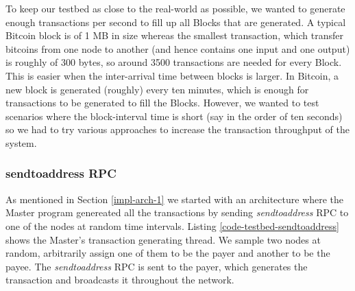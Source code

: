 To keep our testbed as close to the real-world as possible, we wanted to generate enough transactions per second to fill up all Blocks that are generated. A typical Bitcoin block is of 1 MB in size whereas the smallest transaction, which transfer bitcoins from one node to another (and hence contains one input and one output) is roughly of 300 bytes, so around 3500 transactions are needed for every Block. This is easier when the inter-arrival time between blocks is larger. In Bitcoin, a new block is generated (roughly) every ten minutes, which is enough for transactions to be generated to fill the Blocks. However, we wanted to test scenarios where the block-interval time is short (say in the order of ten seconds) so we had to try various approaches to increase the transaction throughput of the system.

\subsubsection{sendtoaddress RPC}

As mentioned in Section \ref{impl-arch-1} we started with an architecture where the Master program genereated all the transactions by sending \textit{sendtoaddress} RPC to one of the nodes at random time intervals. Listing \ref{code-testbed-sendtoaddress} shows the Master's transaction generating thread. 
We sample two nodes at random, arbitrarily assign one of them to be the payer and another to be the payee.
The \textit{sendtoaddress} RPC is sent to the payer, which generates the transaction and broadcasts it throughout the network.


